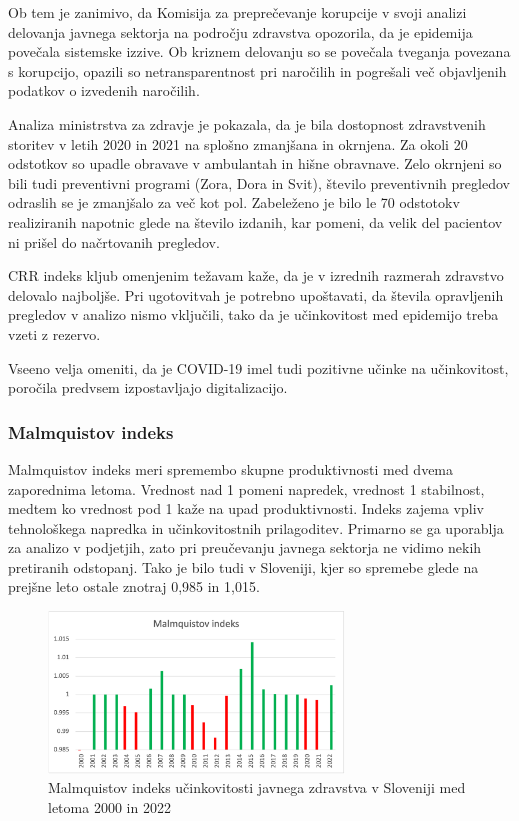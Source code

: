 \documentclass[12pt,a4paper]{article}
\theoremstyle{definition}
\begin{document}
Ob tem je zanimivo, da Komisija za preprečevanje korupcije v svoji analizi delovanja javnega sektorja na področju zdravstva opozorila, da je epidemija povečala sistemske izzive. 
Ob kriznem delovanju so se povečala tveganja povezana s korupcijo, opazili so netransparentnost pri naročilih in pogrešali več objavljenih podatkov o izvedenih naročilih. 
\cite{analizaJavnegaZdravstva2023} 

Analiza ministrstva za zdravje je pokazala, da je bila dostopnost zdravstvenih storitev v letih 2020 in 2021 na splošno zmanjšana in okrnjena. 
Za okoli 20 odstotkov so upadle obravave v ambulantah in hišne obravnave. Zelo okrnjeni so bili tudi preventivni programi (Zora, Dora in Svit), število preventivnih pregledov odraslih se je zmanjšalo za več kot pol. 
Zabeleženo je bilo le 70 odstotokv realiziranih napotnic glede na število izdanih, kar pomeni, da velik del pacientov ni prišel do načrtovanih pregledov. \cite{jamsek2022analiza}

CRR indeks kljub omenjenim težavam kaže, da je v izrednih razmerah zdravstvo delovalo najboljše. Pri ugotovitvah je potrebno upoštavati, da števila opravljenih pregledov v analizo nismo vključili, tako da je učinkovitost med epidemijo treba vzeti z rezervo.

Vseeno velja omeniti, da je COVID-19 imel tudi pozitivne učinke na učinkovitost, poročila predvsem izpostavljajo digitalizacijo.


\subsubsection{Malmquistov indeks}
Malmquistov indeks meri spremembo skupne produktivnosti med dvema zaporednima letoma. 
Vrednost nad 1 pomeni napredek, vrednost 1 stabilnost, medtem ko vrednost pod 1 kaže na upad produktivnosti. 
Indeks zajema vpliv tehnološkega napredka in učinkovitostnih prilagoditev. Primarno se ga uporablja za analizo v podjetjih, 
zato pri preučevanju javnega sektorja ne vidimo nekih pretiranih odstopanj. 
Tako je bilo tudi v Sloveniji, kjer so spremebe glede na prejšne leto ostale znotraj 0,985 in 1,015.

\begin{figure}[H]
    \centering
    \includegraphics[width=0.7\textwidth]{malmq_ind_slo.png}
    \caption{Malmquistov indeks učinkovitosti javnega zdravstva v Sloveniji med letoma 2000 in 2022}
    \label{fig:malmq_ind_slo.png}
\end{figure}

\nocite*{}


\end{document}
